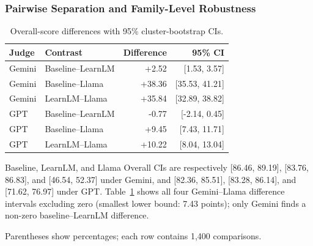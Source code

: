 \documentclass[conference]{IEEEtran}
\begin{document}
\subsubsection{Pairwise Separation and Family-Level Robustness}

\begin{table}[t]
\caption{Overall-score differences with 95\% cluster-bootstrap CIs.}
\label{tab:pairwise-differences}
\centering
\setlength{\tabcolsep}{3.5pt}
\begin{tabular}{llrr}
\hline
Judge & Contrast & Difference & 95\% CI \\
\hline
Gemini & Baseline--LearnLM & +2.52 & [1.53, 3.57] \\
Gemini & Baseline--Llama & +38.36 & [35.53, 41.21] \\
Gemini & LearnLM--Llama & +35.84 & [32.89, 38.82] \\
GPT & Baseline--LearnLM & -0.77 & [-2.14, 0.45] \\
GPT & Baseline--Llama & +9.45 & [7.43, 11.71] \\
GPT & LearnLM--Llama & +10.22 & [8.04, 13.04] \\
\hline
\end{tabular}
\end{table}

Baseline, LearnLM, and Llama Overall CIs are respectively [86.46, 89.19],
[83.76, 86.83], and [46.54, 52.37] under Gemini, and [82.36, 85.51], [83.28,
86.14], and [71.62, 76.97] under GPT. Table~\ref{tab:pairwise-differences}
shows all four Gemini--Llama difference intervals excluding zero (smallest
lower bound: 7.43 points); only Gemini finds a non-zero baseline--LearnLM
difference.

\begin{table}[t]
\caption{Holistic Win/Tie/Lose results.}
\label{tab:holistic-wtl}
\centering
\setlength{\tabcolsep}{3.2pt}

\footnotesize Parentheses show percentages; each row contains 1,400 comparisons.
\end{table}
\end{document}
